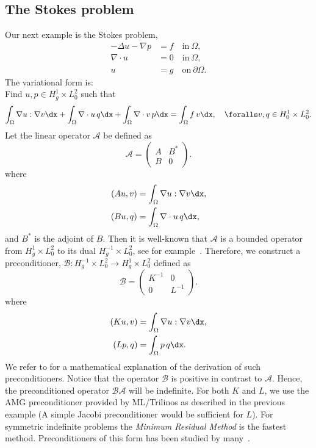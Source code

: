 \subsection{The Stokes problem}
Our next example is the Stokes problem,
\begin{align}
  -\Delta u - \nabla p &= f \quad \mbox{in} \ \Omega, \\
  \nabla \cdot u &= 0 \quad \mbox{in} \  \Omega, \\
  u &= g   \quad \mbox{on} \  \partial \Omega.
\end{align}
The variational form is: \\
Find $u,p \in H^1_g \times L_0^2$ such that
\[
\int_\Omega \nabla u : \nabla v \dx +
\int_\Omega \nabla \cdot u \, q \dx +
\int_\Omega \nabla \cdot v \, p \dx = \int_\Omega f\, v \dx   , \quad
\foralls v,q \in H^1_0 \times L_0^2.
\]
Let the linear operator $\mathcal{A}$ be defined as
\[
\mathcal{A}  =
\begin{pmatrix} A & B^* \\ B & 0 \end{pmatrix}.
\]
where
\begin{align}
  (A u, v) &= \int_\Omega \nabla u : \nabla v \dx, \\
  (B u, q) &= \int_\Omega \nabla \cdot u \, q \dx,
\end{align}
and $B^*$ is the adjoint of $B$.  Then it is well-known that
$\mathcal{A}$ is a bounded operator from $H^1_g \times L_0^2$ to its
dual $H_g^{-1} \times L_0^2$, see for
example~\citet{Brezzi1974,BrezziFortin1991}. Therefore, we construct a
preconditioner, $\mathcal{B}: H_g^{-1} \times L_0^2 \rightarrow
H^1_g \times L_0^2$ defined as
\[
\mathcal{B}
=
\begin{pmatrix} K^{-1} & 0 \\ 0 & L^{-1} \end{pmatrix}.
\]
where
\begin{align}
  (K u, v) &= \int_\Omega \nabla u: \nabla v \dx, \\
  (L p, q) &= \int_\Omega p \, q \dx.
\end{align}
We refer to \citet{MardalWinther11} for a mathematical explanation of
the derivation of such preconditioners.  Notice that the operator
$\mathcal{B}$ is positive in contrast to $\mathcal{A}$. Hence, the
preconditioned operator $\mathcal{B} \mathcal{A}$ will be
indefinite. For both $K$ and $L$, we use the AMG preconditioner
provided by ML/Trilinos as described in the previous example (A simple
Jacobi preconditioner would be sufficient for $L$).  For symmetric
indefinite problems the \emph{Minimum Residual Method} is the fastest
method. Preconditioners of this form has been studied by
many~\citep{ElmanSilvesterWathen2005,RustenWinther1992,SilvesterWathen1993,SilvesterWathen1994}.

